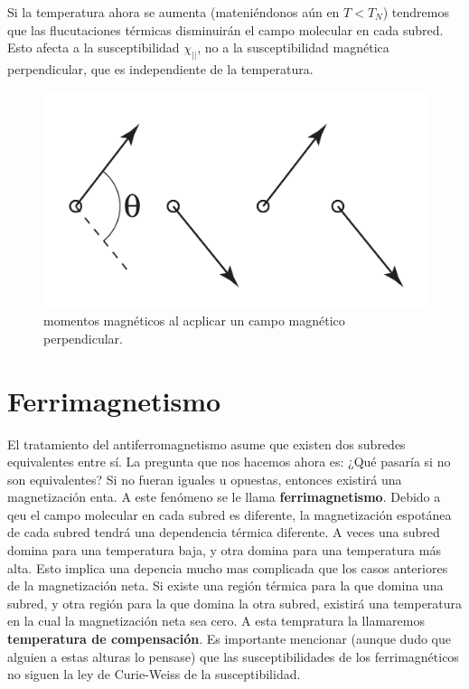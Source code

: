 \documentclass[12pt,a4paper]{book}
\numberwithin{equation}{section}
\numberwithin{figure}{section}
\begin{document}
Si la temperatura ahora se aumenta (mateniéndonos aún en $T<T_N$) tendremos que las flucutaciones térmicas disminuirán el campo molecular en cada subred. Esto afecta a la susceptibilidad $\chi_{||}$, no a la susceptibilidad magnética perpendicular, que es independiente de la temperatura. \\

\begin{figure}
    \centering
    \includegraphics[scale=0.3]{05-Antiferro.png}
    \caption{momentos magnéticos al acplicar un campo magnético perpendicular.}
    \label{Fig:05-02-03}
\end{figure}



\section{Ferrimagnetismo}

El tratamiento del antiferromagnetismo asume que existen dos subredes equivalentes entre sí. La pregunta que nos hacemos ahora es: ¿Qué pasaría si no son equivalentes? Si no fueran iguales u opuestas, entonces existirá una magnetización enta. A este fenómeno se le llama \textbf{ferrimagnetismo}. Debido a qeu el campo molecular en cada subred es diferente, la magnetización espotánea de cada subred tendrá una dependencia térmica diferente. A veces una subred domina para una temperatura baja, y otra domina para una temperatura más alta. Esto implica una depencia mucho mas complicada que los casos anteriores de la magnetización neta. Si existe una región térmica para la que domina una subred, y otra región para la que domina la otra subred, existirá una temperatura en la cual la magnetización neta sea cero. A esta tempratura la llamaremos \textbf{temperatura de compensación}. Es importante mencionar (aunque dudo que alguien a estas alturas lo pensase) que las susceptibilidades de los ferrimagnéticos no siguen la ley de Curie-Weiss de la susceptibilidad. \\
\end{document}
